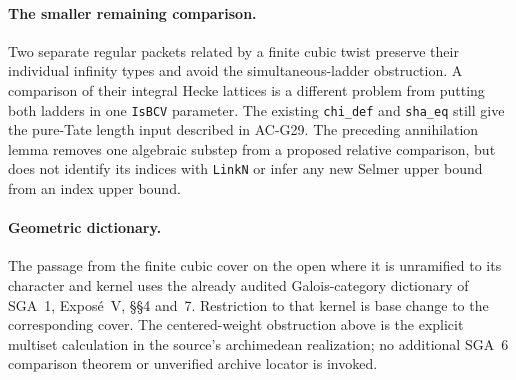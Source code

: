 \paragraph{The smaller remaining comparison.}
Two separate regular packets related by a finite cubic
twist preserve their individual infinity types and avoid
the simultaneous-ladder obstruction.  A comparison of
their integral Hecke lattices is a different problem from
putting both ladders in one \texttt{IsBCV} parameter.
The existing \texttt{chi\_def} and \texttt{sha\_eq}
still give the pure-Tate length input described in AC-G29.
The preceding annihilation lemma removes one algebraic
substep from a proposed relative comparison, but does not
identify its indices with \texttt{LinkN} or infer any
new Selmer upper bound from an index upper bound.

\paragraph{Geometric dictionary.}
The passage from the finite cubic cover on the open where it
is unramified to its character and kernel uses the already
audited Galois-category dictionary of SGA~1, Expos\'e~V,
\S\S4 and~7.  Restriction to that kernel is base change to
the corresponding cover.  The centered-weight obstruction
above is the explicit multiset calculation in the source's
archimedean realization; no additional SGA~6 comparison
theorem or unverified archive locator is invoked.
